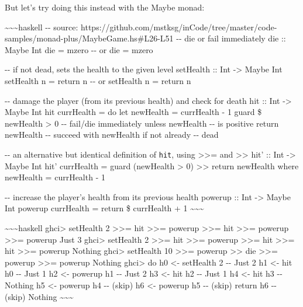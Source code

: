 \documentclass[]{article}
\begin{document}
But let's try doing this instead with the Maybe monad:

\textasciitilde{}\textasciitilde{}\textasciitilde{}haskell -\/- source:
https://github.com/mstksg/inCode/tree/master/code-samples/monad-plus/MaybeGame.hs\#L26-L51
-\/- die or fail immediately die :: Maybe Int die = mzero -\/- or die = mzero

-\/- if not dead, sets the health to the given level setHealth :: Int
-\textgreater{} Maybe Int setHealth n = return n -\/- or setHealth n = return n

-\/- damage the player (from its previous health) and check for death hit :: Int
-\textgreater{} Maybe Int hit currHealth = do let newHealth = currHealth - 1
guard \$ newHealth \textgreater{} 0 -\/- fail/die immediately unless newHealth
-\/- is positive return newHealth -\/- succeed with newHealth if not already
-\/- dead

-\/- an alternative but identical definition of \texttt{hit}, using
\textgreater{}\textgreater{}= and \textgreater{}\textgreater{} hit' :: Int
-\textgreater{} Maybe Int hit' currHealth = guard (newHealth \textgreater{} 0)
\textgreater{}\textgreater{} return newHealth where newHealth = currHealth - 1

-\/- increase the player's health from its previous health powerup :: Int
-\textgreater{} Maybe Int powerup currHealth = return \$ currHealth + 1
\textasciitilde{}\textasciitilde{}\textasciitilde{}

\textasciitilde{}\textasciitilde{}\textasciitilde{}haskell ghci\textgreater{}
setHealth 2 \textgreater{}\textgreater{}= hit \textgreater{}\textgreater{}=
powerup \textgreater{}\textgreater{}= hit \textgreater{}\textgreater{}= powerup
\textgreater{}\textgreater{}= powerup Just 3 ghci\textgreater{} setHealth 2
\textgreater{}\textgreater{}= hit \textgreater{}\textgreater{}= powerup
\textgreater{}\textgreater{}= hit \textgreater{}\textgreater{}= hit
\textgreater{}\textgreater{}= powerup Nothing ghci\textgreater{} setHealth 10
\textgreater{}\textgreater{}= powerup \textgreater{}\textgreater{} die
\textgreater{}\textgreater{}= powerup \textgreater{}\textgreater{}= powerup
Nothing ghci\textgreater{} do h0 \textless{}- setHealth 2 -\/- Just 2 \textbar{}
h1 \textless{}- hit h0 -\/- Just 1 \textbar{} h2 \textless{}- powerup h1 -\/-
Just 2 \textbar{} h3 \textless{}- hit h2 -\/- Just 1 \textbar{} h4 \textless{}-
hit h3 -\/- Nothing \textbar{} h5 \textless{}- powerup h4 -\/- (skip) \textbar{}
h6 \textless{}- powerup h5 -\/- (skip) \textbar{} return h6 -\/- (skip) Nothing
\textasciitilde{}\textasciitilde{}\textasciitilde{}
\end{document}
